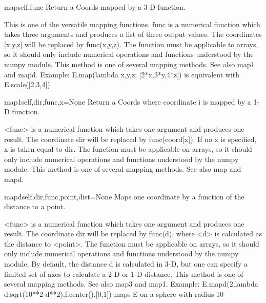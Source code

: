 \begin{funcdesc}{map}{self,func}
Return a Coords mapped by a 3-D function.

        This is one of the versatile mapping functions.
        func is a numerical function which takes three arguments and produces
        a list of three output values. The coordinates [x,y,z] will be
        replaced by func(x,y,z).
        The function must be applicable to arrays, so it should
        only include numerical operations and functions understood by the
        numpy module.
        This method is one of several mapping methods. See also map1 and mapd.
        Example: E.map(lambda x,y,z: [2*x,3*y,4*z])
        is equivalent with E.scale([2,3,4])
        
\end{funcdesc}

\begin{funcdesc}{map1}{self,dir,func,x=None}
Return a Coords where coordinate i is mapped by a 1-D function.

        <func> is a numerical function which takes one argument and produces
        one result. The coordinate dir will be replaced by func(coord[x]).
        If no x is specified, x is taken equal to dir. 
        The function must be applicable on arrays, so it should only
        include numerical operations and functions understood by the
        numpy module.
        This method is one of several mapping methods. See also map and mapd.
        
\end{funcdesc}

\begin{funcdesc}{mapd}{self,dir,func,point,dist=None}
Maps one coordinate by a function of the distance to a point.

        <func> is a numerical function which takes one argument and produces
        one result. The coordinate dir will be replaced by func(d), where <d>
        is calculated as the distance to <point>.
        The function must be applicable on arrays, so it should only
        include numerical operations and functions understood by the
        numpy module.
        By default, the distance d is calculated in 3-D, but one can specify
        a limited set of axes to calculate a 2-D or 1-D distance.
        This method is one of several mapping methods. See also map3 and map1.
        Example: E.mapd(2,lambda d:sqrt(10**2-d**2),f.center(),[0,1])
        maps E on a sphere with radius 10
        
\end{funcdesc}


